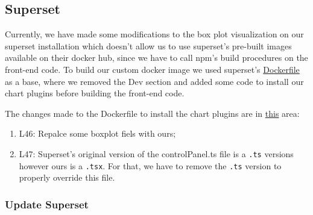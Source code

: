 \documentclass[
]{book}
\providecommand{\tightlist}{%
  \setlength{\itemsep}{0pt}\setlength{\parskip}{0pt}}
\begin{document}
\hypertarget{superset}{%
\subsection*{Superset}\label{superset}}

Currently, we have made some modifications to the box plot visualization on our superset installation which doesn't allow us to use superset's pre-built images available on their docker hub, since we have to call npm's build procedures on the front-end code.
To build our custom docker image we used superset's \href{https://github.com/apache/superset/blob/1.5.0/Dockerfile}{Dockerfile} as a base, where we removed the Dev section and added some code to install our chart plugins before building the front-end code.

The changes made to the Dockerfile to install the chart plugins are in \href{https://github.com/EHDEN/NetworkDashboards/blob/master/docker/superset/Dockerfile\#L47-L49}{this} area:

\begin{enumerate}
\def\labelenumi{\arabic{enumi}.}
\tightlist
\item
  L46: Repalce some boxplot fiels with ours;
\item
  L47: Superset's original version of the controlPanel.ts file is a \texttt{.ts} versions however ours is a \texttt{.tsx}. For that, we have to remove the \texttt{.ts} version to properly override this file.
\end{enumerate}

\hypertarget{update-superset}{%
\subsubsection*{Update Superset}\label{update-superset}}
\end{document}
